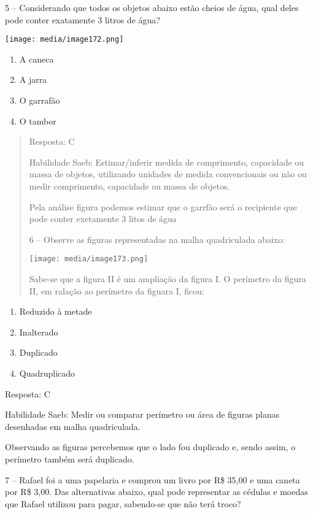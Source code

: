 5 -- Considerando que todos os objetos abaixo estão cheios de água, qual
deles pode conter exatamente 3 litros de água?

\texttt{[image: media/image172.png]}

\begin{enumerate}
\def\labelenumi{\alph{enumi})}
\item
  A caneca
\item
  A jarra
\item
  O garrafão
\item
  O tambor
\end{enumerate}

\begin{quote}
Resposta: C

Habilidade Saeb: Estimar/inferir medida de comprimento, capacidade ou
massa de objetos, utilizando unidades de medida convencionais ou não ou
medir comprimento, capacidade ou massa de objetos.

Pela análise figura podemos estimar que o garrfão será o recipiente que
pode conter exetamente 3 litos de água

6 -- Observe as figuras representadas na malha quadriculada abaixo:

\texttt{[image: media/image173.png]}

Sabe-se que a figura II é um ampliação da figura I. O perímetro da
figura II, em ralação ao perímetro da figuara I, ficou:
\end{quote}

\begin{enumerate}
\def\labelenumi{\alph{enumi})}
\item
  Reduzido à metade
\item
  Inalterado
\item
  Duplicado
\item
  Quadruplicado
\end{enumerate}

Resposta: C

Habilidade Saeb: Medir ou comparar perímetro ou área de figuras planas
desenhadas em malha quadriculada.

Observando as figuras percebemos que o lado fou duplicado e, sendo
assim, o perímetro também será duplicado.

7 -- Rafael foi a uma papelaria e comprou um livro por R\$ 35,00 e uma
caneta por R\$ 3,00. Das alternativas abaixo, qual pode representar as
cédulas e moedas que Rafael utilizou para pagar, sabendo-se que não terá
troco?

